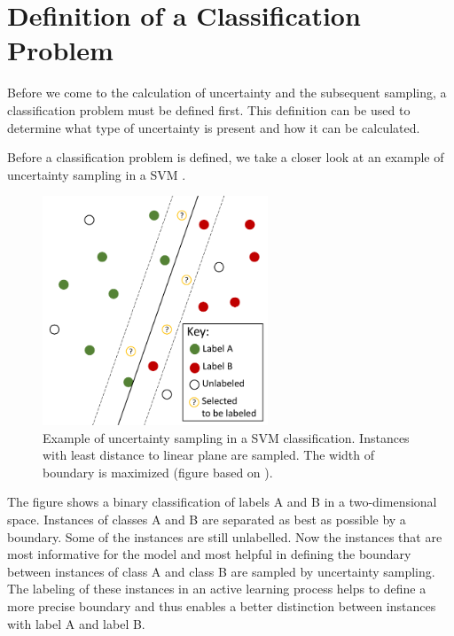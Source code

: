 \section{Definition of a Classification Problem}
\label{sec:definition_of_a_classification_problem}
%
Before we come to the calculation of uncertainty and the subsequent sampling, a classification problem must be defined first.
This definition can be used to determine what type of uncertainty is present and how it can be calculated.

Before a classification problem is defined, we take a closer look at an example of uncertainty sampling in a \ac{SVM} .
\begin{figure}[t]
  \centering
    \includegraphics[width=0.6\textwidth]{figures/SVM.pdf}
  \caption{Example of uncertainty sampling in a \ac{SVM} classification. Instances with least distance to linear plane are sampled.
  The width of boundary is maximized  (figure based on \cite{human-in-the-loop}).}
  \label{fig:svm}
\end{figure}
The figure shows a binary classification of labels A and B in a two-dimensional space.
Instances of classes A and B are separated as best as possible by a boundary.
Some of the instances are still unlabelled.
Now the instances that are most informative for the model and most helpful in defining the boundary between instances of class A and class B are sampled by uncertainty sampling.
The labeling of these instances in an active learning process helps to define a more precise boundary and thus enables a better distinction between instances with label A and label B.


